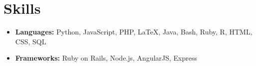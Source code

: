 \documentclass[letterpaper,10pt]{article}
\begin{document}
  \section*{Skills}
  \begin{itemize}
    \item \textbf{Languages:}
      Python, JavaScript, PHP, \LaTeX, Java, Bash, Ruby, R, HTML, CSS, SQL
    \item \textbf{Frameworks:}
      Ruby on Rails, Node.js, AngularJS, Express
  \end{itemize}
\end{document}
